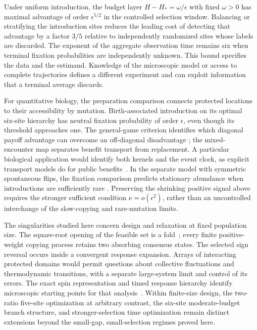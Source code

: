 \documentclass[aps,pre,reprint,amsmath,amssymb,longbibliography]{revtex4-2}
\begin{document}
Under uniform introduction, the budget layer
$H-H_* = \omega/\epsilon$ with fixed $\omega>0$ has maximal advantage
of order $\epsilon^{5/2}$ in the controlled selection window.
Balancing or stratifying the introduction sites reduces the leading cost
of detecting that advantage by a factor $3/5$ relative to independently
randomized sites whose labels are discarded. The exponent of the aggregate
observation time remains six when terminal fixation probabilities
are independently unknown. This bound specifies the data and the
estimand. Knowledge of the microscopic model or access to complete
trajectories defines a different experiment and can exploit information
that a terminal average discards.

For quantitative biology, the preparation comparison connects
protected locations to their accessibility by mutation. Birth-associated
introduction on its optimal six-site hierarchy has neutral fixation
probability of order $\epsilon$, even though its threshold approaches
one. The general-game criterion identifies which diagonal payoff
advantage can overcome an off-diagonal disadvantage
\cite{TarnitaEtAl2009}; the mixed-encounter map separates benefit
transport from replacement. A particular biological application would
identify both kernels and the event clock, as explicit transport models
do for public benefits~\cite{AllenGoreNowak2013}. In the separate
model with symmetric spontaneous flips, the fixation comparison
predicts stationary abundance when introductions are sufficiently rare
\cite{McAvoyAllen2021}. Preserving the shrinking positive signal above
requires the stronger sufficient condition $\nu=o(\epsilon^2)$,
rather than an uncontrolled interchange of the slow-copying and
rare-mutation limits.

The singularities studied here concern design and relaxation at fixed
population size. The square-root opening of the feasible set is a
fold~\cite{PriorityKuznetsov2006}; every finite positive-weight
copying process retains two absorbing consensus states. The selected
sign reversal occurs inside a convergent response expansion. Arrays
of interacting protected domains would permit questions about collective
fluctuations and thermodynamic transitions, with a separate large-system
limit and control of its errors. The exact spin representation and timed
response hierarchy identify microscopic starting points for that
analysis~\cite{Schutz2001,DelRazoLammaMerbis2026}. Within finite-size
design, the two-ratio five-site optimization at arbitrary contrast,
the six-site moderate-budget branch structure, and stronger-selection
time optimization remain distinct extensions beyond the small-gap,
small-selection regimes proved here.
\end{document}
